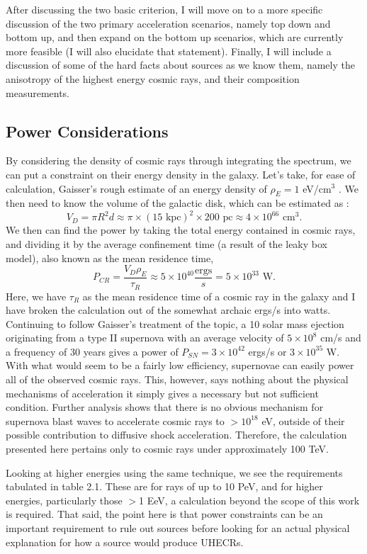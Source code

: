 After discussing the two basic criterion, I will move on to a more specific discussion of the two primary acceleration scenarios, namely top down and bottom up, and then expand on the bottom up scenarios, which are currently more feasible (I will also elucidate that statement). Finally, I will include a discussion of some of the hard facts about sources as we know them, namely the anisotropy of the highest energy cosmic rays, and their composition measurements.

\subsection{Power Considerations}
By considering the density of cosmic rays through integrating the spectrum, we can put a constraint on their energy density in the galaxy. Let's take, for ease of calculation, Gaisser's rough estimate of an energy density of $\rho_E=1$ eV/cm$^3$ \cite{crapp}. We then need to know the volume of the galactic disk, which can be estimated as :
$$V_D=\pi R^2 d\approx \pi \times (15\mbox{ kpc})^2\times200\mbox{ pc}\approx4\times10^{66}\mbox{ cm}^3.$$
 We then can find the power by taking the total energy contained in cosmic rays, and dividing it by the average confinement time (a result of the leaky box model), also known as the mean residence time,
 $$P_{CR}=\frac{V_D \rho_E}{\tau_R}\approx 5\times10^{40} \frac{\mbox{ergs}}{s}=5\times10^{33}\mbox{ W}.$$
 Here, we have $\tau_R$ as the mean residence time of a cosmic ray in the galaxy and I have broken the calculation out of the somewhat archaic ergs/s into watts. Continuing to follow Gaisser's treatment of the topic, a 10 solar mass ejection originating from a type II supernova with an average velocity of $5\times 10^8$ cm/s and a frequency of 30 years gives a power of $P_{SN}=3\times10^{42}$ ergs/s or $3\times 10^{35}$ W. With what would seem to be a fairly low efficiency, supernovae can easily power all of the observed cosmic rays. This, however, says nothing about the physical mechanisms of acceleration it simply gives a necessary but not sufficient condition. Further analysis shows that there is no obvious mechanism for supernova blast waves to accelerate cosmic rays to $>10^{18}$ eV, outside of their possible contribution to diffusive shock acceleration. Therefore, the calculation presented here pertains only to cosmic rays under approximately 100 TeV. 
 
 Looking at higher energies using the same technique, we see the requirements tabulated in table 2.1.%
  These are for rays of up to 10 PeV, and for higher energies, particularly those $>$1 EeV, a calculation beyond the scope of this work is required. That said, the point here is that power constraints can be an important requirement to rule out sources before looking for an actual physical explanation for how a source would produce UHECRs.

